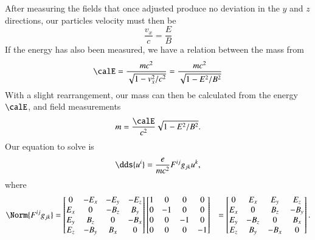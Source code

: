 {After measuring the fields that once adjusted produce no deviation in the \(y\) and \(z\) directions, our particles velocity must then be
%
\begin{equation}\label{eqn:relElectroDynProblemSet2:430}
\frac{v_x}{c} = \frac{E}{B}
\end{equation}
%
If the energy has also been measured, we have a relation between the mass from
%
\begin{equation}\label{eqn:relElectroDynProblemSet2:450}
\calE = \frac{m c^2}{\sqrt{1 - v_x^2/c^2}} = \frac{ m c^2 }{ \sqrt{ 1 - E^2/B^2 }}
\end{equation}
%
With a slight rearrangement, our mass can then be calculated from the energy \(\calE\), and field measurements
%
\begin{equation}\label{eqn:relElectroDynProblemSet2:470}
m = \frac{ \calE }{c^2} \sqrt{ 1 - E^2/B^2 }.
\end{equation}
%
%
%
Our equation to solve is
%
\begin{equation}\label{eqn:relElectroDynProblemSet2:490}
\dds{u^i} = \frac{e}{m c^2} F^{ij} g_{jk} u^k,
\end{equation}
%
where
%
\begin{equation}\label{eqn:relElectroDynProblemSet2:510}
\begin{aligned}
\Norm{ F^{ij} g_{jk} }
&=
\begin{bmatrix}
0 & -E_x & -E_y & -E_z \\
E_x & 0 & -B_z & B_y \\
E_y & B_z & 0 & -B_x \\
E_z & -B_y & B_x & 0
\end{bmatrix}
\begin{bmatrix}
1 & 0 & 0 & 0 \\
0 & -1 & 0 & 0 \\
0 & 0 & -1 & 0 \\
0 & 0 & 0 & -1 \\
\end{bmatrix}
&=
\begin{bmatrix}
0 & E_x & E_y & E_z \\
E_x & 0 & B_z & -B_y \\
E_y & -B_z & 0 & B_x \\
E_z & B_y & -B_x & 0
\end{bmatrix}.
\end{aligned}
\end{equation}
%
}
